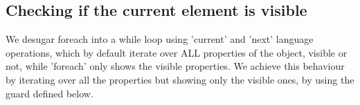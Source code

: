 \documentclass{article}
\begin{document}
\begin{kdefinition}
\begin{module}{}
\begin{syntaxBlock}{}
\end{syntaxBlock}
\begin{kblock}[text]
 \subsection{Checking if the current element is visible} 
		We desugar foreach into a while loop using 'current' and 'next' language operations, 
		which by default iterate over ALL properties of the object, visible or not, while
		'foreach' only shows the visible properties. 
		We achieve this behaviour by iterating over all the properties but showing only 
		the visible ones, by using the guard defined below. \end{kblock}


\end{module}
\end{kdefinition}
\end{document}
